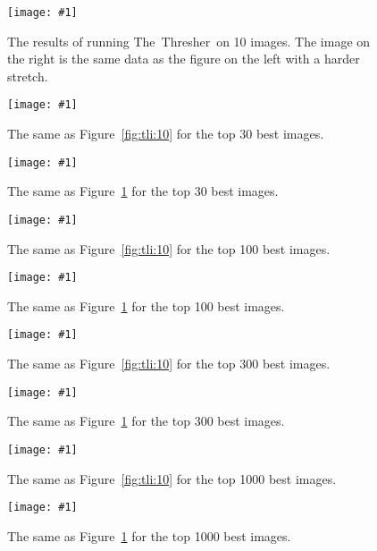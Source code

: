 \documentclass[12pt,preprint]{aastex}
\newcommand{\project}[1]{{\sffamily #1}}
\newcommand{\TheThresher}{\project{The~Thresher}}
\newcommand{\Fig}[1]{Figure~\ref{fig:#1}}
\newcommand{\fig}[1]{\Fig{#1}}
\newcommand{\figlabel}[1]{\label{fig:#1}}
\newcommand{\dfmplot}[1]{%
\begin{center}%
    \texttt{[image: \#1]}%
\end{center}%
}
\newcommand{\threshplot}[1]{%
\begin{center}%
\texttt{[image: \#1]}%
\end{center}%
}
\begin{document}
\begin{figure}[!htbp]
    \threshplot{thresh10.png}
    \caption{The results of running \TheThresher\ on 10 images.
        The image on the right is the same data as the figure on the
        left with a harder stretch.\figlabel{thresh:10}}
\end{figure}

\begin{figure}[!htbp]
    \dfmplot{tli30.png}
    \caption{The same as \fig{tli:10} for the top 30 best images.
            \figlabel{tli:30}}
\end{figure}

\begin{figure}[!htbp]
    \threshplot{thresh30.png}
    \caption{The same as \fig{thresh:10} for the top 30 best images.
            \figlabel{thresh:30}}
\end{figure}

\begin{figure}[!htbp]
    \dfmplot{tli100.png}
    \caption{The same as \fig{tli:10} for the top 100 best images.
            \figlabel{tli:100}}
\end{figure}

\begin{figure}[!htbp]
    \threshplot{thresh100.png}
    \caption{The same as \fig{thresh:10} for the top 100 best images.
            \figlabel{thresh:100}}
\end{figure}

\begin{figure}[!htbp]
    \dfmplot{tli300.png}
    \caption{The same as \fig{tli:10} for the top 300 best images.
            \figlabel{tli:300}}
\end{figure}

\begin{figure}[!htbp]
    \threshplot{thresh300.png}
    \caption{The same as \fig{thresh:10} for the top 300 best images.
            \figlabel{thresh:300}}
\end{figure}

\begin{figure}[!htbp]
    \dfmplot{tli1000.png}
    \caption{The same as \fig{tli:10} for the top 1000 best images.
            \figlabel{tli:1000}}
\end{figure}

\begin{figure}[!htbp]
    \threshplot{thresh1000.png}
    \caption{The same as \fig{thresh:10} for the top 1000 best images.
            \figlabel{thresh:1000}}
\end{figure}
\end{document}
